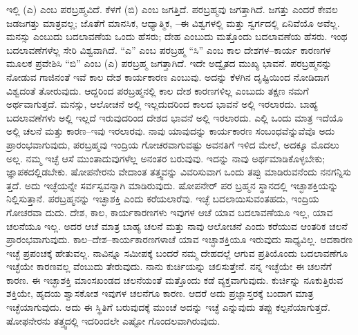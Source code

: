 ಇಲ್ಲಿ (ಎ) ಎಂಬ ಪರಬ್ರಹ್ಮವಿದೆ. ಕೆಳಗೆ (ಬಿ) ಎಂಬ ಜಗತ್ತಿದೆ. ಪರಬ್ರಹ್ಮವು ಜಗತ್ತಾಗಿದೆ. ಜಗತ್ತು ಎಂದರೆ ಕೇವಲ ಜಡಜಗತ್ತು ಮಾತ್ರವಲ್ಲ; ಜೊತೆಗೆ ಮಾನಸಿಕ, ಆಧ್ಯಾತ್ಮಿಕ, –ಈ ವಿಶ್ವಗಳಲ್ಲಿ ಮತ್ತು ಸ್ವರ್ಗದಲ್ಲಿ ಏನಿವೆಯೊ ಅವೆಲ್ಲ. ಮನಸ್ಸು ಎಂಬುದು ಬದಲಾವಣೆಯ ಒಂದು ಹೆಸರು; ದೇಹ ಎಂಬುದು ಮತ್ತೊಂದು ಬದಲಾವಣೆಯ ಹೆಸರು. ಇಂಥ ಬದಲಾವಣೆಗಳೆಲ್ಲ ಸೇರಿ ವಿಶ್ವವಾಗಿದೆ. “ಎ” ಎಂಬ ಪರಬ್ರಹ್ಮ “ಸಿ” ಎಂಬ ಕಾಲ ದೇಶಗಳ–ಕಾರ್ಯ ಕಾರಣಗಳ ಮೂಲಕ ಪ್ರವೇಶಿಸಿ “ಬಿ” ಎಂಬ (ಎ) ಪರಬ್ರಹ್ಮ ಜಗತ್ತಾಗಿದೆ. ಇದೇ ಅದ್ವೈತದ ಮುಖ್ಯ ಭಾವನೆ. ಪರಬ್ರಹ್ಮನನ್ನು ನೋಡುವ ಗಾಜಿನಂತೆ ಇವೆ ಕಾಲ ದೇಶ ಕಾರ್ಯಕಾರಣ ಎಂಬುವು. ಅದನ್ನು ಕೆಳಗಿನ ದೃಷ್ಟಿಯಿಂದ ನೋಡಿದಾಗ ವಿಶ್ವದಂತೆ ತೋರುವುದು. ಆದ್ದರಿಂದ ಪರಬ್ರಹ್ಮನಲ್ಲಿ ಕಾಲ ದೇಶ ಕಾರಣಗಳಿಲ್ಲ ಎಂಬುದು ತಕ್ಷಣ ನಮಗೆ ಅರ್ಥವಾಗುತ್ತದೆ. ಮನಸ್ಸು, ಆಲೋಚನೆ ಅಲ್ಲಿ ಇಲ್ಲದುದರಿಂದ ಕಾಲದ ಭಾವನೆ ಅಲ್ಲಿ ಇರಲಾರದು. ಬಾಹ್ಯ ಬದಲಾವಣೆಗಳು ಅಲ್ಲಿ ಇಲ್ಲದೆ ಇರುವುದರಿಂದ ದೇಶದ ಭಾವನೆ ಅಲ್ಲಿ ಇರಲಾರದು. ಎಲ್ಲಿ ಒಂದು ಮಾತ್ರ ಇದೆಯೊ ಅಲ್ಲಿ ಚಲನೆ ಮತ್ತು ಕಾರಣ–ಇವು ಇರಲಾರವು. ನಾವು ಯಾವುದನ್ನು ಕಾರ್ಯಕಾರಣ ಸಂಬಂಧವೆನ್ನುವೆವೊ ಅದು ಪ್ರಾರಂಭವಾಗುವುದು, ಪರಬ್ರಹ್ಮವು ಇಂದ್ರಿಯ ಗೋಚರವಾಗುವಷ್ಟು ಅವನತಿಗೆ ಇಳಿದ ಮೇಲೆ, ಅದಕ್ಕೂ ಮೊದಲು ಅಲ್ಲ. ನಮ್ಮ ಇಚ್ಛೆ ಆಸೆ ಮುಂತಾದುವುಗಳೆಲ್ಲ ಅನಂತರ ಬರುವುವು. ಇದನ್ನು ನಾವು ಅರ್ಥಮಾಡಿಕೊಳ್ಳಬೇಕು; ಜ್ಞಾಪಕದಲ್ಲಿಡಬೇಕು. ಷೋಪನೇರನು ವೇದಾಂತ ತತ್ತ್ವವನ್ನು ವಿವರಿಸುವಾಗ ಒಂದು ತಪ್ಪು ಮಾಡಿರುವನೆಂದು ನನಗನ್ನಿಸು ತ್ತದೆ. ಅದು ಇಚ್ಛೆಯನ್ನೇ ಸರ್ವಸ್ವವನ್ನಾಗಿ ಮಾಡಿರುವುದು. ಷೋಪನೇರ್​ ಪರ ಬ್ರಹ್ಮನ ಸ್ಥಾನದಲ್ಲಿ ಇಚ್ಛಾಶಕ್ತಿಯನ್ನು ನಿಲ್ಲಿಸುತ್ತಾನೆ. ಪರಬ್ರಹ್ಮನನ್ನು ಇಚ್ಛಾಶಕ್ತಿ ಎಂದು ಕರೆಯಲಾರೆವು. ಇಚ್ಛೆ ಬದಲಾಯಿಸುವಂತಹದು, ಇಂದ್ರಿಯ ಗೋಚರವಾ ದುದು. ದೇಶ, ಕಾಲ, ಕಾರ್ಯಕಾರಣಗಳು ಇವುಗಳ ಆಚೆ ಯಾವ ಬದಲಾವಣೆಯೂ ಇಲ್ಲ, ಯಾವ ಚಲನೆಯೂ ಇಲ್ಲ. ಅದರ ಆಚೆ ಮಾತ್ರ ಬಾಹ್ಯ ಚಲನೆ ಮತ್ತು ನಾವು ಆಲೋಚನೆ ಎಂದು ಕರೆಯುವ ಆಂತರಿಕ ಚಲನೆ ಪ್ರಾರಂಭವಾಗುವುದು. ಕಾಲ–ದೇಶ–ಕಾರ್ಯಕಾರಣಗಳಾಚೆ ಯಾವ ಇಚ್ಛಾಶಕ್ತಿಯೂ ಇರುವುದು ಸಾಧ್ಯವಿಲ್ಲ. ಆದಕಾರಣ ಇಚ್ಛೆ ಪ್ರಪಂಚಕ್ಕೆ ಹೇತುವಲ್ಲ. ನಾವಿನ್ನೂ ಸಮೀಪಕ್ಕೆ ಬಂದರೆ ನಮ್ಮ ದೇಹದಲ್ಲೆ ಆಗುವ ಪ್ರತಿಯೊಂದು ಬದಲಾವಣೆಗೂ ಇಚ್ಛೆಯೇ ಕಾರಣವಲ್ಲ ವೆಂಬುದು ತೇರುವುದು. ನಾನು ಕುರ್ಚಿಯನ್ನು ಚಲಿಸುತ್ತೇನೆ. ನನ್ನ ಇಚ್ಛೆಯೇ ಈ ಚಲನೆಗೆ ಕಾರಣ. ಈ ಇಚ್ಛಾಶಕ್ತಿ ಮಾಂಸಖಂಡದ ಚಲನೆಯಂತೆ ಮತ್ತೊಂದು ಕಡೆ ವ್ಯಕ್ತವಾಗುವುದು. ಕುರ್ಚಿನ್ನು ನೂಕುತ್ತಿರುವ ಶಕ್ತಿಯೇ, ಹೃದಯ ಶ್ವಾಸಕೋಶ ಇವುಗಳ ಚಲನೆಗೂ ಕಾರಣ. ಆದರೆ ಅದು ಪ್ರಜ್ಞಾಸ್ತರಕ್ಕೆ ಬಂದಾಗ ಮಾತ್ರ ಇಚ್ಛೆಯಾಗುವುದು. ಅದು ಈ ಸ್ಥಿತಿಗೆ ಬರುವುದಕ್ಕೆ ಮುಂಚೆ ಅದನ್ನು ಇಚ್ಛೆ ಎನ್ನುವುದು ತಪ್ಪು ಕಲ್ಪನೆಯಾಗುತ್ತದೆ. ಷೋಫನೇರನು ತತ್ತ್ವದಲ್ಲಿ ಇದರಿಂದಲೇ ಎಷ್ಟೋ ಗೊಂದಲವಾಗಿರುವುದು.

